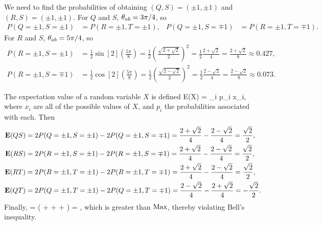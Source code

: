 \begin{solution}
	We need to find the probabilities of obtaining $(Q,S) = (\pm1, \pm1)$ and $(R,S) = (\pm1, \pm1)$.  For $Q$ and $S$, $\theta_{ab} = 3\pi/4$, so
	\begin{align*}
		P(Q=\pm1, S=\pm1) &= P(R=\pm1, T=\pm1), &
		P(Q=\pm1, S=\mp1) &= P(R=\pm1, T=\mp1).
	\end{align*}
	For $R$ and $S$, $\theta_{ab} = 5\pi/4$, so
	\begin{align*}
		P(R=\pm1, S=\pm1) &= \frac{1}{2} \sin[2](\frac{5\pi}{8})
		= \frac{1}{2} \left( \frac{\sqrt{2 + \sqrt{2}}}{2} \right)^2
		= \frac{1}{2} \frac{2 + \sqrt{2}}{4}
		= \frac{2 + \sqrt{2}}{8}
		\approx 0.427, \\
		P(R=\pm1, S=\mp1) &= \frac{1}{2} \cos[2](\frac{5\pi}{8})
		= \frac{1}{2} \left( \frac{\sqrt{2 - \sqrt{2}}}{2} \right)^2
		= \frac{1}{2} \frac{2 - \sqrt{2}}{4}
		= \frac{2 - \sqrt{2}}{8}
		\approx 0.073.
	\end{align*}
	
	The expectation value of a random variable $X$ is defined
	\beq
		E(X) = \sum_{i} p_i x_i,
	\eeq
	where $x_i$ are all of the possible values of $X$, and $p_i$ the probabilities associated with each.  Then
	\begin{align*}
		\vb{E}(QS) &= 2 P(Q=\pm1, S=\pm1) - 2 P(Q=\pm1, S=\mp1)
		= \frac{2 + \sqrt{2}}{4} - \frac{2 - \sqrt{2}}{4}
		= \frac{\sqrt{2}}{2}, \\
		\vb{E}(RS) &= 2 P(R=\pm1, S=\pm1) - 2 P(R=\pm1, S=\mp1)
		= \frac{2 + \sqrt{2}}{4} - \frac{2 - \sqrt{2}}{4}
		= \frac{\sqrt{2}}{2}, \\
		\vb{E}(RT) &= 2 P(R=\pm1, T=\pm1) - 2 P(R=\pm1, T=\mp1)
		= \frac{2 + \sqrt{2}}{4} - \frac{2 - \sqrt{2}}{4}
		= \frac{\sqrt{2}}{2}, \\
		\vb{E}(QT) &= 2 P(Q=\pm1, T=\pm1) - 2 P(Q=\pm1, T=\mp1)
		= \frac{2 - \sqrt{2}}{4} - \frac{2 + \sqrt{2}}{4}
		= -\frac{\sqrt{2}}{2}.
	\end{align*}
	Finally,
	\beq
		=  \left(  +  +  +  \right)
		= ,
	\eeq
	which is greater than $\text{Max}$, thereby violating Bell's inequality.
\end{solution}
